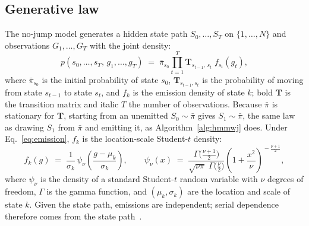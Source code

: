 \subsection{Generative law}
\label{sec:supp-gen-law}

The no-jump model generates a hidden state path $S_0, \dots, S_T$ on
$\{1, \dots, N\}$ and observations $G_1, \dots, G_T$ with the joint
density:
\begin{equation}
  p(s_0, \dots, s_T,\, g_1, \dots, g_T)
  \;=\; \bar\pi_{s_0} \prod_{t=1}^{T}
  \mathbf{T}_{s_{t-1},\, s_t}\; f_{s_t}(g_t),
  \label{eq:supp-joint-law}
\end{equation}
where $\bar\pi_{s_0}$ is the initial probability of state $s_0$,
$\mathbf{T}_{s_{t-1}, s_t}$ is the probability of moving from state
$s_{t-1}$ to state $s_t$, and $f_k$ is the emission density of state
$k$; bold $\mathbf{T}$ is the transition matrix and italic $T$ the
number of observations. Because $\bar\pi$ is stationary for
$\mathbf{T}$, starting from an unemitted $S_0 \sim \bar\pi$ gives
$S_1 \sim \bar\pi$, the same law as drawing $S_1$ from $\bar\pi$ and
emitting it, as Algorithm~\ref{alg:hmmwj} does. Under
Eq.~\eqref{eq:emission}, $f_k$ is the location-scale
Student-$t$ density:
\begin{equation}
  f_k(g) \;=\; \frac{1}{\sigma_k}\,
  \psi_\nu\!\left(\frac{g - \mu_k}{\sigma_k}\right),
  \qquad
  \psi_\nu(x) \;=\;
  \frac{\Gamma\!\big(\tfrac{\nu+1}{2}\big)}
       {\sqrt{\nu \pi}\; \Gamma\!\big(\tfrac{\nu}{2}\big)}
  \left(1 + \frac{x^2}{\nu}\right)^{\!-\frac{\nu+1}{2}},
  \label{eq:supp-emission-density}
\end{equation}
where $\psi_\nu$ is the density of a standard Student-$t$ random
variable with $\nu$ degrees of freedom, $\Gamma$ is the gamma
function, and $(\mu_k, \sigma_k)$ are the location and scale of state
$k$. Given the state path, emissions are independent; serial dependence therefore comes from the state path~\cite{rabinerJuang1986}.

